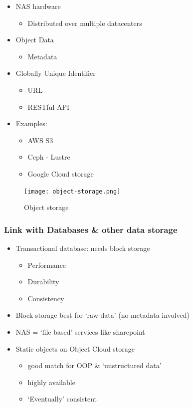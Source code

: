 \documentclass{article}
\begin{document}
\begin{itemize}
    \item NAS hardware
    \begin{itemize}
        \item Distributed over multiple datacenters
    \end{itemize}
    \item Object Data
    \begin{itemize}
        \item Metadata
    \end{itemize}
    \item Globally Unique Identifier
    \begin{itemize}
        \item URL
        \item RESTful API
    \end{itemize}
    \item Examples:
    \begin{itemize}
        \item AWS S3
        \item Ceph - Lustre
        \item Google Cloud storage
    \end{itemize}
\end{itemize}

\begin{figure}[H]
    \centering
    \texttt{[image: object-storage.png]}
    \caption{Object storage}
\end{figure}

\subsubsection{Link with Databases \& other data storage}

\begin{itemize}
    \item Transactional database: needs block storage
    \begin{itemize}
        \item Performance
        \item Durability
        \item Consistency
    \end{itemize}
    \item Block storage best for `raw data' (no metadata involved)
    \item NAS = `file based' services like sharepoint
    \item Static objects on Object Cloud storage
    \begin{itemize}
        \item good match for OOP \& `unstructured data'
        \item highly available
        \item `Eventually' consistent
    \end{itemize}
\end{itemize}
\end{document}
